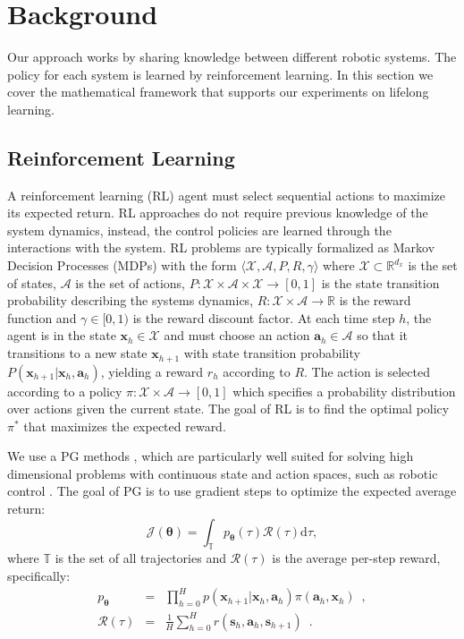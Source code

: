 \documentclass{aamas2016}
\renewcommand{\Re}{\mathbb{R}}
\begin{document}
\section{Background} \label{background}
Our approach works by sharing knowledge between different robotic systems. The policy for each system is learned by reinforcement learning. In this section we cover the mathematical framework that supports our experiments on lifelong learning.

\subsection{Reinforcement Learning}

A reinforcement learning (RL) agent must select sequential actions to maximize its expected return. RL approaches do not 
require previous knowledge of the system dynamics, instead, the control policies are learned through the interactions with the system.
RL problems are typically formalized as Markov Decision Processes (MDPs) with the form $\langle \mathcal{X}, \mathcal{A}, P, R, \gamma \rangle$ where
$\mathcal{X}\subset\Re^{d_{x}}$ is the set of states, $\mathcal{A}$ is the set of actions, 
$P:\mathcal{X}\times \mathcal{A}\times \mathcal{X}\rightarrow [0,1]$ is the state transition probability describing the systems dynamics,
$R:\mathcal{X}\times \mathcal{A} \rightarrow \Re$ is the reward function and $\gamma \in [0,1)$ is the reward discount factor. At each time 
step $h$, the agent is in the state $\mathbf{x}_{h} \in \mathcal{X}$ and must choose an action $\mathbf{a}_{h} \in \mathcal{A}$ so that
it transitions to a new state $\mathbf{x}_{h+1}$ with state transition probability 
$P(\mathbf{x}_{h+1}|\mathbf{x}_{h},\mathbf{a}_{h})$, yielding 
a reward $r_{h}$ according to $R$. The action is selected according to a policy $\pi:\mathcal{X}\times \mathcal{A} \rightarrow [0,1]$ which
specifies a probability distribution over actions given the current state. The goal of RL is to find the optimal policy $\pi^{*}$ 
that maximizes the expected reward.

We use a PG methods \cite{sutton1999policy}, which are particularly well suited for solving high dimensional problems with continuous state and action spaces, such as robotic control \cite{peters2008natural}. The goal of PG is to use gradient steps to optimize the expected average return:
\begin{equation}
 \mathcal{J}(\boldsymbol{\theta})=\int_{\mathbb{T}}p_{\boldsymbol{\theta}}(\tau)\mathcal{R}(\tau)\mbox{d}\tau,
 \label{retPG}
\end{equation}
where $\mathbb{T}$ is the set of all trajectories and $\mathcal{R}(\tau)$ is the average per-step reward, specifically:
\begin{eqnarray}
 p_{\boldsymbol{\theta}} & = & \prod_{h=0}^{H}p(\mathbf{x}_{h+1}|\mathbf{x}_{h},\mathbf{a}_{h})\pi(\mathbf{a}_{h},\mathbf{x}_{h})  \enspace, \nonumber \\
 \mathcal{R}(\tau) & = & \frac{1}{H}\sum_{h=0}^{H} r(\mathbf{s}_{h},\mathbf{a}_{h},\mathbf{s}_{h+1})  \enspace. \nonumber
\end{eqnarray}
\end{document}
